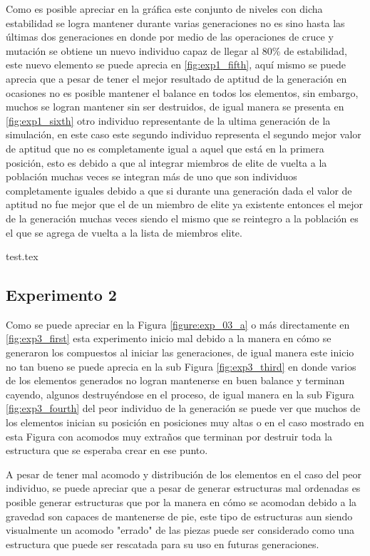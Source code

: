 Como es posible apreciar en la gráfica este conjunto de niveles con dicha
estabilidad se logra mantener durante varias generaciones no es sino hasta las
últimas dos generaciones en donde por medio de las operaciones de cruce y
mutación se obtiene un nuevo individuo capaz de llegar al 80\% de estabilidad,
este nuevo elemento se puede aprecia en \ref{fig:exp1_fifth}, aquí
mismo se puede aprecia que a pesar de tener el mejor resultado de aptitud de
la generación en ocasiones no es posible mantener el balance en todos los
elementos, sin embargo, muchos se logran mantener sin ser destruidos, de igual
manera se presenta en \ref{fig:exp1_sixth} otro individuo representante de la
ultima generación de la simulación, en este caso este segundo individuo
representa el segundo mejor valor de aptitud que no es completamente igual a
aquel que está en la primera posición, esto es debido a que al integrar miembros
de elite de vuelta a la población muchas veces se integran más de uno que son
individuos completamente iguales debido a que si durante una generación dada el
valor de aptitud no fue mejor que el de un miembro de elite ya existente
entonces el mejor de la generación muchas veces siendo el mismo que se reintegro
a la población es el que se agrega de vuelta a la lista de miembros elite.

{test.tex} 

\newpage

\subsection{Experimento 2}
\label{chap6:exp_2}

Como se puede apreciar en la Figura \ref{figure:exp_03_a} o más directamente en
\ref{fig:exp3_first} esta experimento inicio mal debido a la manera en cómo se
generaron los compuestos al iniciar las generaciones, de igual manera este inicio
no tan bueno se puede aprecia en la sub Figura \ref{fig:exp3_third} en donde
varios de los elementos generados no logran mantenerse en buen balance y terminan
cayendo, algunos destruyéndose en el proceso, de igual manera en la sub Figura
\ref{fig:exp3_fourth} del peor individuo de la generación se puede ver que
muchos de los elementos inician su posición en posiciones muy altas o en el caso
mostrado en esta Figura con acomodos muy extraños que terminan por destruir toda
la estructura que se esperaba crear en ese punto.

A pesar de tener mal acomodo y distribución de los elementos en el caso del peor
individuo, se puede apreciar que a pesar de generar estructuras mal ordenadas es
posible generar estructuras que por la manera en cómo se acomodan debido a la
gravedad son capaces de mantenerse de pie, este tipo de estructuras aun siendo
visualmente un acomodo "errado" de las piezas puede ser considerado como una
estructura que puede ser rescatada para su uso en futuras generaciones.

